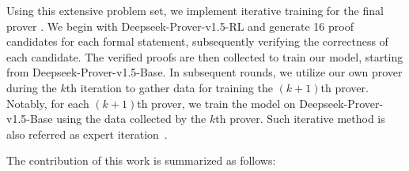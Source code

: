 Using this extensive problem set, we implement iterative training for the final prover \citep{xin2024deepseek, li2024hunyuanprover, wu2024internlm2}. We begin with Deepseek-Prover-v1.5-RL and generate 16 proof candidates for each formal statement, subsequently verifying the correctness of each candidate. The verified proofs are then collected to train our model, starting from Deepseek-Prover-v1.5-Base. In subsequent rounds, we utilize our own prover during the \(k\)th iteration to gather data for training the \((k+1)\)th prover. Notably, for each \((k+1)\)th prover, we train the model on Deepseek-Prover-v1.5-Base using the data collected by the \(k\)th prover.  Such iterative method is also referred as expert iteration~\citep{polu2022formal}.

The contribution of this work is summarized as follows:
 
